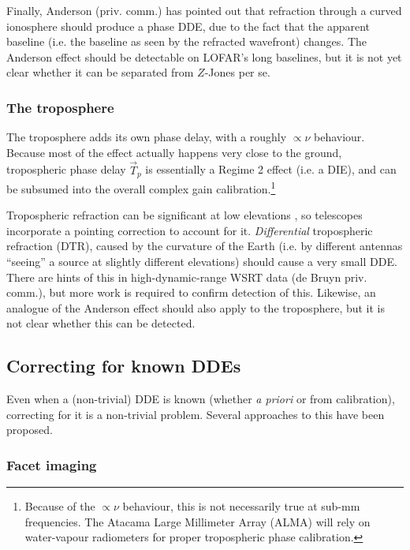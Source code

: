 \documentclass{aa}
\newcommand{\jones}[2]{\vec {#1}_{#2}}
\begin{document}
Finally, Anderson (priv. comm.) has pointed out that refraction through a curved ionosphere should produce a phase DDE, due to the fact that the apparent baseline (i.e. the baseline as seen by the refracted wavefront) changes. The Anderson effect should be detectable on LOFAR's long baselines, but it is not yet clear whether it can be separated from $Z$-Jones per se.
 
\subsubsection{The troposphere\label{sec:troposphere}}

The troposphere adds its own phase delay, with a roughly $\propto\nu$ behaviour. Because most of the effect actually happens very close to the ground, tropospheric phase delay $\jones{T}{p}$ is essentially a Regime 2 effect (i.e. a DIE), and can be subsumed into the overall complex gain calibration.\footnote{Because of the $\propto\nu$ behaviour, this is not necessarily true at sub-mm frequencies. The Atacama Large Millimeter Array (ALMA) will rely on water-vapour radiometers for proper tropospheric phase calibration.}

Tropospheric refraction can be significant at low elevations \citep[Sect~10.1]{tms}, so telescopes incorporate a pointing correction to account for it. \emph{Differential} tropospheric refraction (DTR), caused by the curvature of the Earth (i.e. by different antennas ``seeing'' a source at slightly different elevations) should cause a very small DDE. There are hints of this in high-dynamic-range WSRT data (de Bruyn priv. comm.), but more work is required to confirm detection of this. Likewise, an analogue of the Anderson effect should also apply to the troposphere, but it is not clear whether this can be detected.

\subsection{Correcting for known DDEs\label{sec:dde-correction}}

Even when a (non-trivial) DDE is known (whether \emph{a priori} or from calibration), correcting for it is a non-trivial problem. Several approaches to this have been proposed.

\subsubsection{Facet imaging}
\end{document}
